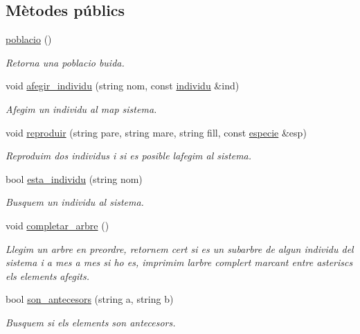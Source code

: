 \subsection*{Mètodes públics}
\begin{DoxyCompactItemize}
\item 
\hyperlink{classpoblacio_a8d6ad7ce285dd47c9cfd806e302d7086}{poblacio} ()
\begin{DoxyCompactList}\small\item\em Retorna una poblacio buida. \end{DoxyCompactList}\item 
void \hyperlink{classpoblacio_a09a516141a9a8bef9249239916894af5}{afegir\+\_\+individu} (string nom, const \hyperlink{classindividu}{individu} \&ind)
\begin{DoxyCompactList}\small\item\em Afegim un individu al map sistema. \end{DoxyCompactList}\item 
void \hyperlink{classpoblacio_a70b7e64f9857ade2c4b5d6168af09f17}{reproduir} (string pare, string mare, string fill, const \hyperlink{classespecie}{especie} \&esp)
\begin{DoxyCompactList}\small\item\em Reproduim dos individus i si es posible l\textquotesingle{}afegim al sistema. \end{DoxyCompactList}\item 
bool \hyperlink{classpoblacio_a9c6fe58f2cbd06574070df2ef4076015}{esta\+\_\+individu} (string nom)
\begin{DoxyCompactList}\small\item\em Busquem un individu al sistema. \end{DoxyCompactList}\item 
void \hyperlink{classpoblacio_a1e30be9019dcb194171228c41284117f}{completar\+\_\+arbre} ()
\begin{DoxyCompactList}\small\item\em Llegim un arbre en preordre, retornem cert si es un subarbre de algun individu del sistema i a mes a mes si ho es, imprimim l\textquotesingle{}arbre complert marcant entre asteriscs els elements afegits. \end{DoxyCompactList}\item 
bool \hyperlink{classpoblacio_a0002a245d187017cf1af34b364c176a0}{son\+\_\+antecesors} (string a, string b)
\begin{DoxyCompactList}\small\item\em Busquem si els elements son antecesors. \end{DoxyCompactList}\item 

\end{DoxyCompactItemize}
